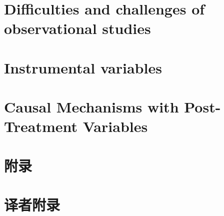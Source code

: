 \documentclass[krantz1]{krantz}
\renewcommand{\theparagraph}{\arabic{chapter}.\arabic{paragraph}}
\begin{document}
\part{Difficulties and challenges of observational studies}\label{part::challenges-os}






\part{Instrumental variables}\label{part::instrumentalvariables}






\part{Causal Mechanisms with Post-Treatment Variables}\label{part::post-treatmentvariable}





\appendix
\part{附录}

\renewcommand{\theparagraph}{\Alph{chapter}.\arabic{paragraph}}




\part{译者附录}

\end{document}
